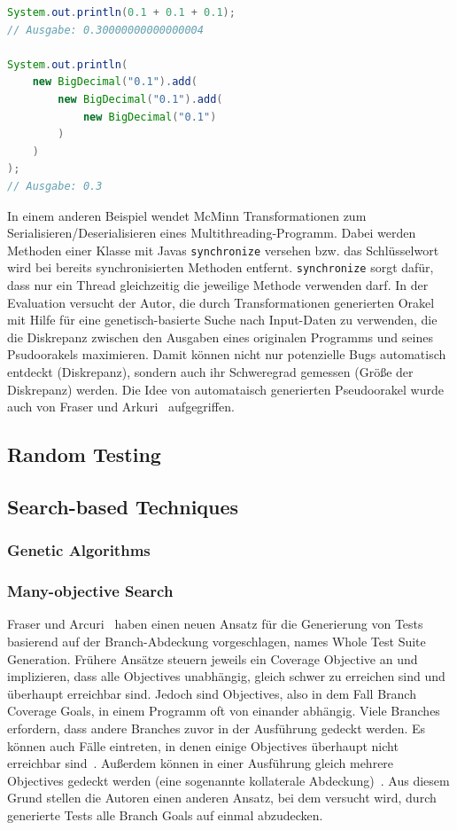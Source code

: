 \documentclass{article}
\begin{document}
\begin{lstlisting}[language=Java, caption=Comparing floating-point arithmetic in Java (version 6) using double compared to BigDecimal~\cite{10.1145/1569901.1570127}, label=lst:java-transformations]
System.out.println(0.1 + 0.1 + 0.1);
// Ausgabe: 0.30000000000000004

System.out.println(
    new BigDecimal("0.1").add(
        new BigDecimal("0.1").add(
            new BigDecimal("0.1")
        )
    )
);
// Ausgabe: 0.3
\end{lstlisting}
In einem anderen Beispiel wendet McMinn Transformationen zum Serialisieren/Deserialisieren eines Multithreading-Programm. Dabei werden Methoden einer Klasse mit Javas \lstinline{synchronize} versehen bzw. das Schlüsselwort wird bei bereits synchronisierten Methoden entfernt. \lstinline{synchronize} sorgt dafür, dass nur ein Thread gleichzeitig die jeweilige Methode verwenden darf. In der Evaluation versucht der Autor, die durch Transformationen generierten Orakel mit Hilfe für eine genetisch-basierte Suche nach Input-Daten zu verwenden, die die Diskrepanz zwischen den Ausgaben eines originalen Programms und seines Psudoorakels maximieren. Damit können nicht nur potenzielle Bugs automatisch entdeckt (Diskrepanz), sondern auch ihr Schweregrad gemessen (Größe der Diskrepanz) werden. Die Idee von automataisch generierten Pseudoorakel wurde auch von Fraser und Arkuri~\cite{Fraser_2013} aufgegriffen. 

\subsection{Random Testing}
\subsection{Search-based Techniques}
\subsubsection{Genetic Algorithms}

\subsubsection{Many-objective Search}
 Fraser und Arcuri~\cite{Fraser_2013} haben einen neuen Ansatz für die Generierung von Tests basierend auf der Branch-Abdeckung vorgeschlagen, names Whole Test Suite Generation. Frühere Ansätze steuern jeweils ein Coverage Objective an und implizieren, dass alle Objectives unabhängig, gleich schwer zu erreichen sind und überhaupt erreichbar sind. Jedoch sind Objectives, also in dem Fall Branch Coverage Goals, in einem Programm oft von einander abhängig. Viele Branches erfordern, dass andere Branches zuvor in der Ausführung gedeckt werden. Es können auch Fälle eintreten, in denen einige Objectives überhaupt nicht erreichbar sind~\cite{Goldberg_1994}. Außerdem können in einer Ausführung gleich mehrere Objectives gedeckt werden (eine sogenannte kollaterale Abdeckung)~\cite{Fraser_2011}. Aus diesem Grund stellen die Autoren einen anderen Ansatz, bei dem versucht wird, durch generierte Tests alle Branch Goals auf einmal abzudecken. 
\end{document}
